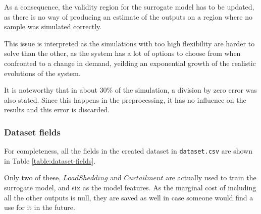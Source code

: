 As a consequence, the validity region for the surrogate model has to be updated, as there is no way of producing an estimate of the outputs on a region where no sample was simulated correctly.

This issue is interpreted as the simulations with too high flexibility are harder to solve than the other, as the system has a lot of options to choose from when confronted to a change in demand, yeilding an exponential growth of the realistic evolutions of the system.

It is noteworthy that in about 30\% of the simulation, a division by zero error was also stated. Since this happens in the preprocessing, it has no influence on the results and this error is discarded.


\subsubsection{Dataset fields}

For completeness, all the fields in the created dataset in \texttt{dataset.csv} are shown in Table \ref{table:dataset-fields}.

Only two of these, $LoadShedding$ and $Curtailment$ are actually used to train the surrogate model, and six as the model features. As the marginal cost of including all the other outputs is null, they are saved as well in case someone would find a use for it in the future.

